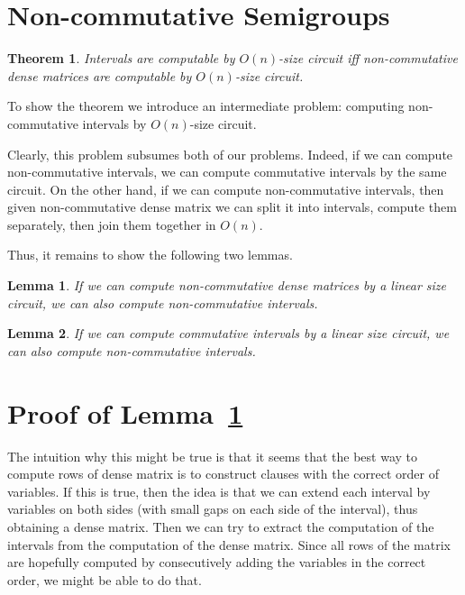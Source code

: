 \documentclass[11pt,letterpaper]{article}
\newtheorem{lemma}{Lemma}
\newtheorem{theorem}{Theorem}
\begin{document}
\section{Non-commutative Semigroups}

\begin{theorem}
Intervals are computable by $O(n)$-size circuit iff non-commutative dense matrices are computable by $O(n)$-size circuit.
\end{theorem}

To show the theorem we introduce an intermediate problem: computing non-commutative intervals by $O(n)$-size circuit.

Clearly, this problem subsumes both of our problems. Indeed, if we can compute non-commutative intervals, we can compute commutative intervals by the same circuit.
On the other hand, if we can compute non-commutative intervals, then given non-commutative dense matrix we can split it into intervals, compute them separately, then join them together in $O(n)$.

Thus, it remains to show the following two lemmas.

\begin{lemma} \label{lem:dense_matrices}
If we can compute non-commutative dense matrices by a linear size circuit, we can also compute non-commutative intervals.
\end{lemma}

\begin{lemma} \label{lem:intervals}
If we can compute commutative intervals by a linear size circuit, we can also compute non-commutative intervals.
\end{lemma}

\section{Proof of Lemma~\ref{lem:dense_matrices}}

The intuition why this might be true is that it seems that the best way to compute rows of dense matrix is to construct clauses with the correct order of variables. If this is true, then the idea is that we can extend each interval by variables on both sides (with small gaps on each side of the interval), thus obtaining a dense matrix. Then we can try to extract the computation of the intervals from the computation of the dense matrix. Since all rows of the matrix are hopefully computed by consecutively adding the variables in the correct order, we might be able to do that.
\end{document}
